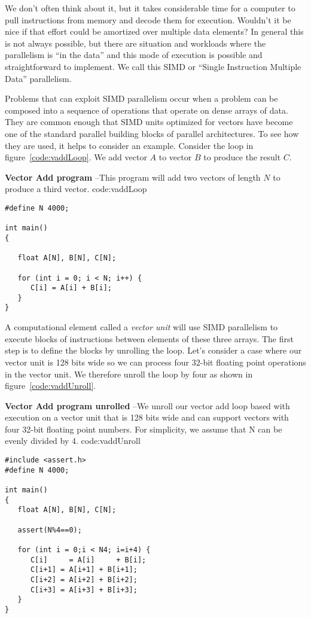 We don't often think about it, but it takes considerable time for a computer to pull instructions from memory
and decode them for execution.  Wouldn't it be nice if that effort could be amortized over multiple data 
elements?   In general this is not always possible, but there are situation and workloads where the parallelism is ``in the data''
and this mode of execution is possible and straightforward to implement.  We call this 
SIMD or ``Single Instruction Multiple Data'' parallelism.

Problems that can exploit SIMD parallelism occur when a problem can be composed into a sequence of
operations that operate on dense arrays of data.   They are common enough that SIMD units optimized
for vectors have become one of the standard parallel building blocks of parallel architectures.  To see
how they are used, it helps to consider an example.  Consider the loop in figure~\ref{code:vaddLoop}.  
We add vector $A$ to vector $B$ to produce the result $C$.   


\begin{CodeExample}%
{\textbf{Vector Add program} --\small This program will add two vectors of length $N$
to produce a third vector.
}%
{code:vaddLoop}
\begin{lstlisting}
#define N 4000;

int main()
{

   float A[N], B[N], C[N];

   for (int i = 0; i < N; i++) {
      C[i] = A[i] + B[i];
   }
}	  
\end{lstlisting}
\end{CodeExample}


A computational element called a \emph{vector unit}
will use SIMD parallelism to execute blocks of instructions between elements of these three arrays. The 
first step is to define the blocks by unrolling the loop.  Let's consider a case where our vector unit is 128 bits
wide so we can process four 32-bit floating point operations in the vector unit.  We therefore 
unroll the loop by four as shown in figure~\ref{code:vaddUnroll}.  

\begin{CodeExample}%
{\textbf{Vector Add program unrolled} --\small We unroll our vector add loop based with execution 
on a vector unit that is 128 bits wide and can support vectors with four 32-bit floating point numbers.  For 
simplicity, we assume that N can be evenly divided by 4.
}%
{code:vaddUnroll}
\begin{lstlisting}
#include <assert.h>
#define N 4000;

int main()
{
   float A[N], B[N], C[N];
   
   assert(N%4==0);

   for (int i = 0;i < N4; i=i+4) {
      C[i]     = A[i]     + B[i];
      C[i+1] = A[i+1] + B[i+1];
      C[i+2] = A[i+2] + B[i+2];
      C[i+3] = A[i+3] + B[i+3];   
   }
}	  
\end{lstlisting}
\end{CodeExample}


